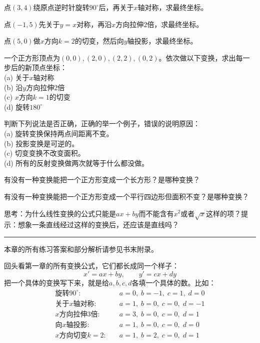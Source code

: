 \documentclass[a4paper,12pt]{ctexart}
\begin{document}
\begin{exercise}[综合练习1]
\item 点$(3,4)$绕原点逆时针旋转$90^\circ$后，再关于$x$轴对称，求最终坐标。
\item 点$(-1,5)$先关于$y=x$对称，再沿$x$方向拉伸$2$倍，求最终坐标。
\item 点$(5,0)$做$x$方向$k=2$的切变，然后向$y$轴投影，求最终坐标。
\item 一个正方形顶点为$(0,0),(2,0),(2,2),(0,2)$。依次做以下变换，求出每一步后的新顶点坐标：\\
(a) 关于$x$轴对称 \\
(b) 沿$y$方向拉伸$2$倍 \\
(c) $x$方向$k=1$的切变 \\
(d) 旋转$180^\circ$
\item 判断下列说法是否正确，正确的举一个例子，错误的说明原因：\\
(a) 旋转变换保持两点间距离不变。\\
(b) 投影变换是可逆的。\\
(c) 切变变换不改变面积。\\
(d) 所有的反射变换做两次就等于什么都没做。
\item 有没有一种变换能把一个正方形变成一个长方形？是哪种变换？
\item 有没有一种变换能把一个正方形变成一个平行四边形但面积不变？是哪种变换？
\item 思考：为什么线性变换的公式只能是$ax+by$而不能含有$x^2$或者$\sqrt{x}$这样的项？提示：想象一条直线经过这样的变换后，还应该是直线吗？
\end{exercise}

\vfill
\noindent\rule{\textwidth}{0.4pt}
本章的所有练习答案和部分解析请参见书末附录。

\newpage



回头看第一章的所有变换公式，它们都长成同一个样子：
\[
x' = ax + by,\qquad y' = cx + dy
\]
把一个具体的变换写下来，就是给$a,b,c,d$各填一个具体的数。比如：
\begin{align*}
\text{旋转}90^\circ:\quad &a=0,\;b=-1,\;c=1,\;d=0\\
\text{关于$x$轴对称}:\quad &a=1,\;b=0,\;c=0,\;d=-1\\
\text{$x$方向拉伸$3$倍}:\quad &a=3,\;b=0,\;c=0,\;d=1\\
\text{向$x$轴投影}:\quad &a=1,\;b=0,\;c=0,\;d=0\\
\text{$x$方向切变$k=2$}:\quad &a=1,\;b=2,\;c=0,\;d=1
\end{align*}
\end{document}
